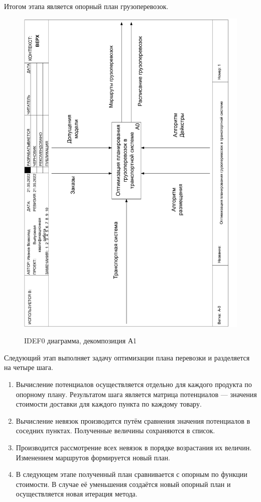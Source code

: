 Итогом этапа является опорный план грузоперевозок.

\pagebreak
\begin{figure}[h]
	\begin{center}
		{\includegraphics[scale=0.63, angle=-90, page=3]{img/idef0.pdf}}
		\caption{IDEF0 диаграмма, декомпозиция А1}
		\label{idef0:A1}
	\end{center}
\end{figure}

Следующий этап выполняет задачу оптимизации плана перевозки и разделяется на четыре шага.
\begin{enumerate}
	\item Вычисление потенциалов осуществляется отдельно для каждого продукта по опорному плану. Результатом шага является матрица потенциалов --- значения стоимости доставки для каждого пункта по каждому товару.
	\item Вычисление невязок производится путём сравнения значения потенциалов в соседних пунктах. Полученные величины сохраняются в список.
	\item Производится рассмотрение всех невязок в порядке возрастания их величин. Изменением маршрутов формируется новый план.
	\item В следующем этапе полученный план сравнивается с опорным по функции стоимости. В случае её уменьшения создаётся новый опорный план и осуществляется новая итерация метода.
\end{enumerate}

